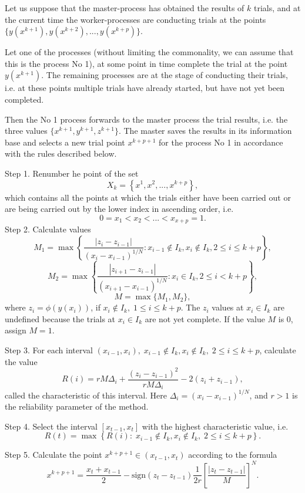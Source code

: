 \documentclass[mathematics,article,submit,pdftex,moreauthors]{Definitions/mdpi}
\begin{document}
Let us suppose that the master-process has obtained the results of $k$ trials, and at the current time the worker-processes are conducting trials at the points
$\{y(x^{k+1}), y(x^{k+2}), ...,y(x^{k+p})\}$.

Let one of the processes (without limiting the commonality, we can assume that this is the process No 1), at some point in time complete the trial at the point $y(x^{k+1})$.
The remaining processes are at the stage of conducting their trials, i.e. at these points multiple trials have already started, but have not yet been completed.

Then the No 1 process forwards to the master process the trial results, i.e. the three values $\{x^{k+1},y^{k+1},z^{k+1}\}$.
The master saves the results in its information base and selects a new trial point $x^{k+p+1}$ for the process No 1 in accordance with the rules described below.

Step 1. Renumber he point of the set 
\[
X_k = \left\{x^1, x^2,...,x^{k+p} \right\},
\]
which contains all the points at which the trials either have been carried out or are being carried out by the lower index in ascending order, i.e.
\[
0=x_1<x_2<...<x_{x+p}=1.
\]
Step 2. Calculate values
\[
M_1=\max \left\{ \frac{ \left|z_i - z_{i-1} \right|}{(x_i-x_{i-1})^{1/N}} : x_{i-1} \notin I_k, x_i \notin I_k, 2\leq i\leq k+p \right\},
\]
\[
M_2=\max \left\{ \frac{ \left|z_{i+1} - z_{i-1} \right|}{(x_{i+1}-x_{i-1})^{1/N}} : x_i \in I_k, 2\leq i < k+p \right\},
\]
\[
M=\max\{M_1,M_2\},
\]
where $z_i=\phi(y(x_i))$, if $x_i \notin I_k, \; 1\leq i \leq k+p$. The $z_i$ values at $x_i \in I_k$ are undefined because the trials at $x_i \in I_k$ are not yet complete. If the value $M$ is 0, assign $M=1$.

Step 3. For each interval $(x_{i-1},x_i), \; x_{i-1} \notin I_k, x_i \notin I_k, \; 2\leq i\leq k+p$, calculate the value 
\[
R(i)=rM\Delta_i+\frac{(z_i-z_{i-1})^2}{rM\Delta_i}-2(z_i+z_{i-1}),
\]
called the characteristic of this interval. Here $\Delta_i=\left(x_i-x_{i-1}\right)^{1/N}$, and $r>1$ is the reliability parameter of the method.

Step 4. Select the interval $[x_{t-1},x_t]$ with the highest characteristic value, i.e.
\[
R(t) = \max \left\{ R(i): \; x_{i-1} \notin I_k, x_i \notin I_k, \; 2\leq i\leq k+p \right\}.
\]

Step 5. Calculate the point $x^{k+p+1} \in (x_{t-1},x_t)$ according to the formula
\[
x^{k+p+1} = \frac{x_{t}+x_{t-1}}{2} - \mathrm{sign}(z_{t}-z_{t-1})\frac{1}{2r}\left[\frac{\left|z_{t}-z_{t-1}\right|}{M}\right]^N.
\]
\end{document}

